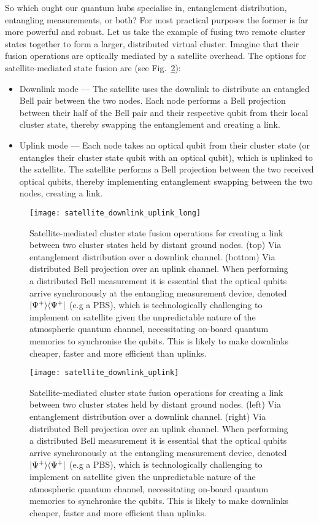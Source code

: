 So which ought our quantum hubs specialise in, entanglement distribution, entangling measurements, or both? For most practical purposes the former is far more powerful and robust. Let us take the example of fusing two remote cluster states together to form a larger, distributed virtual cluster. Imagine that their fusion operations are optically mediated by a satellite overhead. The options for satellite-mediated state fusion are (see Fig.~\ref{fig:sat_up_down}):
\begin{itemize}
	\item Downlink mode --- The satellite uses the downlink to distribute an entangled Bell pair between the two nodes. Each node performs a Bell projection between their half of the Bell pair and their respective qubit from their local cluster state, thereby swapping the entanglement and creating a link.
	\item Uplink mode --- Each node takes an optical qubit from their cluster state (or entangles their cluster state qubit with an optical qubit), which is uplinked to the satellite. The satellite performs a Bell projection between the two received optical qubits, thereby implementing entanglement swapping between the two nodes, creating a link.
\end{itemize}

\pubmode
	\begin{figure}[!htbp]
		\texttt{[image: satellite\_downlink\_uplink\_long]}
		\caption{Satellite-mediated cluster state fusion operations for creating a link between two cluster states held by distant ground nodes. (top) Via entanglement distribution over a downlink channel. (bottom) Via distributed Bell projection over an uplink channel. When performing a distributed Bell measurement it is essential that the optical qubits arrive synchronously at the entangling measurement device, denoted \mbox{$|\Psi^+\rangle\langle\Psi^+|$} (e.g a PBS), which is technologically challenging to implement on satellite given the unpredictable nature of the atmospheric quantum channel, necessitating on-board quantum memories to synchronise the qubits. This is likely to make downlinks cheaper, faster and more efficient than uplinks.} \label{fig:sat_up_down}
	\end{figure}
\else
	\begin{figure*}[!htbp]
		\texttt{[image: satellite\_downlink\_uplink]}
		\caption{Satellite-mediated cluster state fusion operations for creating a link between two cluster states held by distant ground nodes. (left) Via entanglement distribution over a downlink channel. (right) Via distributed Bell projection over an uplink channel. When performing a distributed Bell measurement it is essential that the optical qubits arrive synchronously at the entangling measurement device, denoted \mbox{$|\Psi^+\rangle\langle\Psi^+|$} (e.g a PBS), which is technologically challenging to implement on satellite given the unpredictable nature of the atmospheric quantum channel, necessitating on-board quantum memories to synchronise the qubits. This is likely to make downlinks cheaper, faster and more efficient than uplinks.} \label{fig:sat_up_down}
	\end{figure*}
\fi

